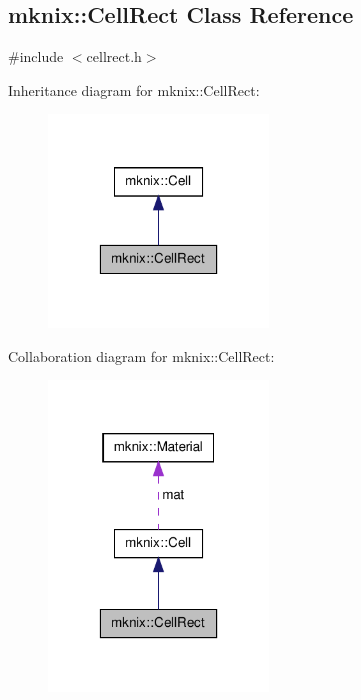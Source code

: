 \hypertarget{classmknix_1_1_cell_rect}{\subsection{mknix\-:\-:Cell\-Rect Class Reference}
\label{classmknix_1_1_cell_rect}
}


{\ttfamily \#include $<$cellrect.\-h$>$}



Inheritance diagram for mknix\-:\-:Cell\-Rect\-:\nopagebreak
\begin{figure}[H]
\begin{center}
\leavevmode
\includegraphics[width=166pt]{d4/dac/classmknix_1_1_cell_rect__inherit__graph}
\end{center}
\end{figure}


Collaboration diagram for mknix\-:\-:Cell\-Rect\-:\nopagebreak
\begin{figure}[H]
\begin{center}
\leavevmode
\includegraphics[width=166pt]{d3/db0/classmknix_1_1_cell_rect__coll__graph}
\end{center}
\end{figure}
